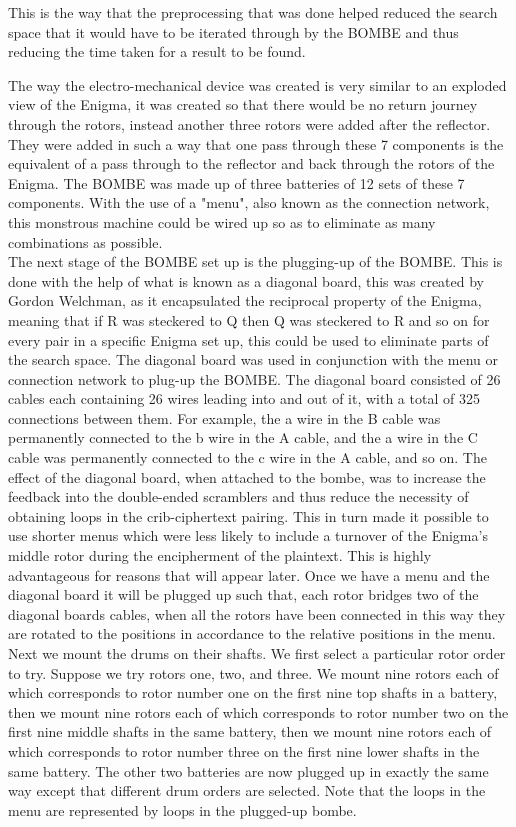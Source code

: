 \documentclass[12pt,a4paper]{article}
\begin{document}
This is the way that the preprocessing that was done helped reduced the search space that it would have to be iterated through by the BOMBE and thus reducing the time taken for a result to be found.

The way the electro-mechanical device was created is very similar to an exploded view of the Enigma, it was created so that there would be no return journey through the rotors, instead another three rotors were added after the reflector. They were added in such a way that one pass through these 7 components is the equivalent of a pass through to the reflector and back through the rotors of the Enigma. The BOMBE was made up of three batteries of 12 sets of these 7 components. With the use of a "menu", also known as the connection network, this monstrous machine could be wired up so as to eliminate as many combinations as possible.\\

The next stage of the BOMBE set up is the plugging-up of the BOMBE. This is done with the help of what is known as a diagonal board, this was created by Gordon Welchman, as it encapsulated the reciprocal property of the Enigma, meaning that if R was steckered to Q then Q was steckered to R and so on for every pair in a specific Enigma set up, this could be used to eliminate parts of the search space. The diagonal board was used in conjunction with the menu or connection network to plug-up the BOMBE. The diagonal board consisted of 26 cables each containing 26 wires leading into and out of it, with a total of 325 connections between them. For example, the a wire in the B cable was permanently connected to the b wire in the A cable, and the a wire in the C cable was permanently connected to the c wire in the A cable, and so on. The effect of the diagonal board, when attached to the bombe, was to increase the feedback into the double-ended scramblers and thus reduce the necessity of obtaining loops in the crib-ciphertext pairing. This in turn made it possible to use shorter menus which were less likely to include a turnover of the Enigma's middle rotor during the encipherment of the plaintext. This is highly advantageous for reasons that will appear later. Once we have a menu and the diagonal board it will be plugged up such that, each rotor bridges two of the diagonal boards cables, when all the rotors have been connected in this way they are rotated to the positions in accordance to the relative positions in the menu. Next we mount the drums on their shafts. We first select a particular rotor order to try. Suppose we try rotors one, two, and three. We mount nine rotors each of which corresponds to rotor number one on the first nine top shafts in a battery, then we mount nine rotors each of which corresponds to rotor number two on the first nine middle shafts in the same battery, then we mount nine rotors each of which corresponds to rotor number three on the first nine lower shafts in the same battery. The other two batteries are now plugged up in exactly the same way except that different drum orders are selected. Note that the loops in the menu are represented by loops in the plugged-up bombe.\\
\end{document}
